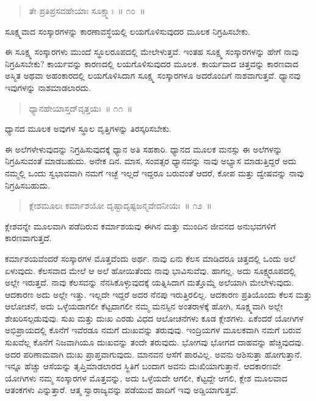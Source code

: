 \vspace{-0.3cm}

\begin{verse}
ತೇ ಪ್ರತಿಪ್ರಸವಹೇಯಾಃ ಸೂಕ್ಷ್ಮಾಃ~॥ ೧೦~॥
\end{verse}

\vspace{-0.3cm}

ಸೂಕ್ಷ್ಮವಾದ ಸಂಸ್ಕಾರಗಳನ್ನು ಕಾರಣಾವಸ್ಥೆಯಲ್ಲಿ ಲಯಗೊಳಿಸುವುದರ ಮೂಲಕ ನಿಗ್ರಹಿಸಬೇಕು. 

ಈ ಸೂಕ್ಷ್ಮ ಸಂಸ್ಕಾರಗಳು ಮುಂದೆ ಸ್ಥೂಲರೂಪದಲ್ಲಿ ಮೇಲೇಳುತ್ತವೆ. ಇಂತಹ ಸೂಕ್ಷ್ಮ ಸಂಸ್ಕಾರಗಳನ್ನು ಹೇಗೆ ನಾವು ನಿಗ್ರಹಿಸಬೇಕು? ಕಾರ್ಯವನ್ನು ಕಾರಣದಲ್ಲಿ ಲಯಗೊಳಿಸುವುದರ ಮೂಲಕ. ಕಾರ್ಯವಾದ ಚಿತ್ತವನ್ನು ಕಾರಣವಾದ ಅಸ್ಮಿತ ಅಥವಾ ಅಹಂಕಾರದಲ್ಲಿ ಲಯಗೊಳಿಸಿದಾಗ ಸೂಕ್ಷ್ಮ ಸಂಸ್ಕಾರಗಳೂ ಅದರೊಂದಿಗೆ ನಾಶವಾಗುತ್ತವೆ. ಧ್ಯಾನವು ಇವುಗಳನ್ನು ನಾಶಮಾಡಲಾರದು. 

\vspace{-0.3cm}

\begin{verse}
ಧ್ಯಾನಹೇಯಾಸ್ತದ್​ವೃತ್ತಯಃ~॥ ೧೧~॥
\end{verse}

\vspace{-0.3cm}

ಧ್ಯಾನದ ಮೂಲಕ ಅವುಗಳ ಸ್ಥೂಲ ವೃತ್ತಿಗಳನ್ನು ತಿರಸ್ಕರಿಸಬೇಕು. 

ಈ ಅಲೆಗಳೇಳುವುದನ್ನು ನಿಗ್ರಹಿಸುವುದಕ್ಕೆ ಧ್ಯಾನ ಅತಿ ಸಹಕಾರಿ. ಧ್ಯಾನದ ಮೂಲಕ ಮನಸ್ಸು ಈ ಅಲೆಗಳನ್ನು ನಿಗ್ರಹಿಸುವಂತೆ ಮಾಡಬಹುದು. ಅನೇಕ ದಿನ. ಮಾಸ, ಸಂವತ್ಸರ ಧ್ಯಾನವನ್ನು ನಾವು ಅಭ್ಯಾಸ ಮಾಡುತ್ತಿದ್ದರೆ ಅದು ನಮ್ಮಲ್ಲಿ ಒಂದು ಸ್ವಭಾವವಾಗಿ ನಮಗೆ ಇಚ್ಛೆ ಇಲ್ಲದೆ ಇದ್ದರೂ ಬರುವಂತೆ ಆದರೆ, ಕೋಪ ಮತ್ತು ದ್ವೇಷವನ್ನು ನಾವು ನಿಗ್ರಹಿಸಬಹುದು. 

\vspace{-0.3cm}

\begin{verse}
ಕ್ಲೇಶಮೂಲಃ ಕರ್ಮಾಶಯೋ ದೃಷ್ಟಾದೃಷ್ಟಜನ್ಮವೇದನೀಯಃ~॥ ೧೨~॥
\end{verse}

\vspace{-0.3cm}

ಕ್ಲೇಶವನ್ನೇ ಮೂಲವಾಗಿ ಪಡೆದಿರುವ ಕರ್ಮಾಶಯವು ಈಗಿನ ಮತ್ತು ಮುಂದಿನ ಜೀವನದ ಅನುಭವಗಳಿಗೆ ಕಾರಣವಾಗುತ್ತದೆ. 

ಕರ್ಮಾಶಯವೆಂದರೆ ಸಂಸ್ಕಾರಗಳ ಮೊತ್ತವೆಂದು ಅರ್ಥ. ನಾವು ಏನು ಕೆಲಸ ಮಾಡಿದರೂ ಚಿತ್ತದಲ್ಲಿ ಒಂದು ಅಲೆ ಏಳುವುದು. ಕೆಲಸವಾದ ಮೇಲೆ ಆ ಅಲೆ ಹೋಯಿತೆಂದು ನಾವು ಭಾವಿಸುವೆವು. ಹಾಗಲ್ಲ. ಅದು ಸೂಕ್ಷ್ಮರೂಪದಲ್ಲಿ ಅಲ್ಲೇ ಇರುತ್ತದೆ. ನಾವು ಕೆಲಸವನ್ನು ನೆನಸಿಕೊಳ್ಳುವುದಕ್ಕೆ ಯತ್ನಿಸಿದಾಗ ಮತ್ತೊಮ್ಮೆ ಅಲೆಯಾಗಿ ಮೇಲೇಳುವುದು. ಆದಕಾರಣ ಅದು ಅಲ್ಲೇ ಇತ್ತು. ಇಲ್ಲದೇ ಇದ್ದರೆ ಅದರ ನೆನಪು ಇರುತ್ತಿರಲಿಲ್ಲ. ಆದಕಾರಣ ಪ್ರತಿಯೊಂದು ಕೆಲಸ ಮತ್ತು ಆಲೋಚನೆ, ಅದು ಒಳ್ಳೆಯದಾಗಲೀ ಕೆಟ್ಟದಾಗಲೀ ನಮ್ಮ ಮನಸ್ಸಿನ ಅಂತರಾಳಕ್ಕೆ ಹೋಗಿ, ಸೂಕ್ಷ್ಮವಾಗಿ ಅಲ್ಲೇ ಶೇಖರಿಸಲ್ಪಡುವುವು. ಸುಖ ಮತ್ತು ದುಃಖ ಎರಡು ವಿಧದ ಆಲೋಚನೆಗಳು ಕೂಡ ಕ್ಲೇಶಗಳು. ಏಕೆಂದರೆ ಯೋಗಿಗಳ ಅಭಿಪ್ರಾಯದಲ್ಲಿ ಕೊನೆಗೆ ಇವೆರಡೂ ನಮಗೆ ದುಃಖವನ್ನು ತರುವುವು. ಇಂದ್ರಿಯಗಳ ಮೂಲಕವಾಗಿ ನಮಗೆ ಬರುವ ಸುಖವೆಲ್ಲ ಕೊನೆಗೆ ನಿಜವಾಗಿಯೂ ದುಃಖವನ್ನು ತಂದೇ ತರುವುದು. ಭೋಗವು ಭೋಗದ ದಾಹವನ್ನು ಹೆಚ್ಚಿವುದವು. ಅದರ ಪರಿಣಾಮವಾಗಿ ದುಃಖ ಪ್ರಾಪ್ತವಾಗುವುದು. ಮಾನವನ ಆಸೆಗೆ ಪಾರವಿಲ್ಲ. ಅವನು ಆಶಿಸುತ್ತಾ ಹೋಗುತ್ತಾನೆ. ಇನ್ನೂ ಹೆಚ್ಚು ಆಸೆಯನ್ನು ತೃಪ್ತಿಮಾಡಲಾರದ ಸ್ಥಿತಿಗೆ ಬಂದಾಗ ಅವನು ದುಃಖಿಯಾಗುತ್ತಾನೆ. ಆದಕಾರಣವೇ ಯೋಗಿಗಳು ನಮ್ಮ ಸಂಸ್ಕಾರಗಳ ಮೊತ್ತವನ್ನು, ಅದು ಒಳ್ಳೆಯದೇ ಆಗಲೀ, ಕೆಟ್ಟದ್ದೇ ಆಗಲಿ, ಕ್ಲೇಶ ಮೂಲವಾದ ಆತಂಕಗಳು ಎನ್ನುತ್ತಾರೆ. ಆತ್ಮ ಸ್ವಾರಾಜ್ಯವನ್ನು ಪಡೆಯುವ ಹಾದಿಗೆ ಇವು ಅಡ್ಡಿಯಾಗುತ್ತವೆ. 

